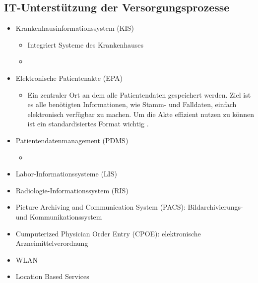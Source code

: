 	\subsection{IT-Unterstützung der Versorgungsprozesse}
	\parencite{oswald2019} \parencite[14]{braeutigam2017}
	\begin{itemize}
		\item Krankenhausinformationssystem (KIS)

		\begin{itemize}
			\item Integriert Systeme des Krankenhauses
			\item 
		\end{itemize}
		\item Elektronische Patientenakte (EPA)
		\begin{itemize}
			\item Ein zentraler Ort an dem alle Patientendaten gespeichert werden. Ziel ist es alle benötigten Informationen, wie Stamm- und Falldaten, einfach elektronisch verfügbar zu machen. Um die Akte effizient nutzen zu können ist ein standardisiertes Format wichtig \parencite[62]{oswald2019}.
		\end{itemize}
		\item Patientendatenmanagement (PDMS)
		\begin{itemize}
			\item 
		\end{itemize}
		\item Labor-Informationssysteme (LIS)
		\item Radiologie-Informationssystem (RIS)
		\item Picture Archiving and Communication System (PACS): Bildarchivierungs- und Kommunikationssystem
		\item Cumputerized Physician Order Entry (CPOE): elektronische Arzneimittelverordnung
		\item WLAN
		\item Location Based Services \parencite{mci/Leimeister2006}
	\end{itemize}
